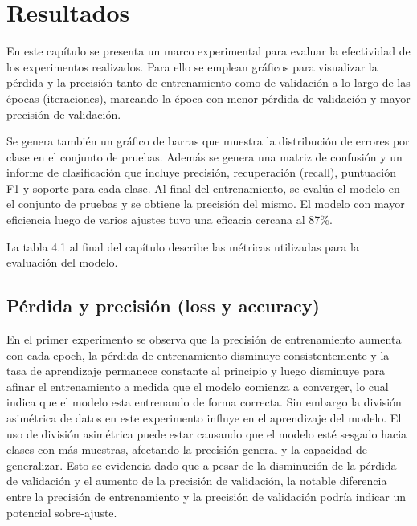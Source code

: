 \chapter{Resultados}\label{chapter:results}
En este capítulo se presenta un marco experimental para evaluar la efectividad de los experimentos realizados. Para ello se emplean gráficos para visualizar la pérdida y la precisión tanto de entrenamiento como de validación a lo largo de las épocas (iteraciones), marcando la época con menor pérdida de validación y mayor precisión de validación.

Se genera también un gráfico de barras que muestra la distribución de errores por clase en el conjunto de pruebas. Además se genera una matriz de confusión y un informe de clasificación que incluye precisión, recuperación (recall), puntuación F1 y soporte para cada clase. Al final del entrenamiento, se evalúa el modelo en el conjunto de pruebas y se obtiene la precisión del mismo. El modelo con mayor eficiencia luego de varios ajustes tuvo una eficacia cercana al 87\%.

La tabla 4.1 al final del capítulo describe las métricas utilizadas para la evaluación del modelo.

\section*{Pérdida y precisión (loss y accuracy)}

En el primer experimento se observa que la precisión de entrenamiento aumenta con cada epoch, la pérdida de entrenamiento disminuye consistentemente y la tasa de aprendizaje permanece constante al principio y luego disminuye para afinar el entrenamiento a medida que el modelo comienza a converger, lo cual indica que el modelo esta entrenando de forma correcta. Sin embargo la división asimétrica de datos en este experimento influye en el aprendizaje del modelo. El uso de división asimétrica puede estar causando que el modelo esté sesgado hacia clases con más muestras, afectando la precisión general y la capacidad de generalizar. Esto se evidencia dado que a pesar de la disminución de la pérdida de validación y el aumento de la precisión de validación, la notable diferencia entre la precisión de entrenamiento y la precisión de validación podría indicar un potencial sobre-ajuste.

